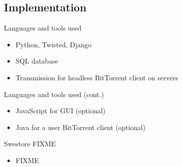 \documentclass{beamer}
\begin{document}
\subsection{Implementation}
\begin{frame}{Languages and tools used}
  \begin{itemize}
  \item
    Python, Twisted, Django
  \item
    SQL database
  \item
    Transmission for headless BitTorrent client on servers
  \end{itemize}
\end{frame}

\begin{frame}{Languages and tools used (cont.)}
  \begin{itemize}
  \item
    JavaScript for GUI (optional)
  \item
    Java for a user BitTorrent client (optional)
  \end{itemize}
\end{frame}

\begin{frame}{Swestore FIXME}
  \begin{itemize}
  \item
    FIXME
  \end{itemize}
\end{frame}
\end{document}
